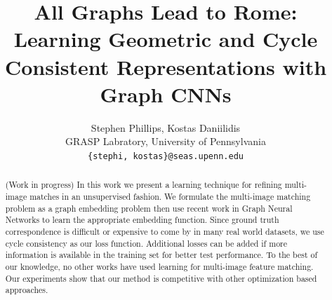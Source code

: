 \documentclass[10pt,twocolumn,letterpaper]{article}
\begin{document}
\title{All Graphs Lead to Rome: Learning Geometric and Cycle Consistent Representations with Graph CNNs}

\author{Stephen Phillips, Kostas Daniilidis \\
GRASP Labratory, University of Pennsylvania\\
{\tt\small \{stephi, kostas\}@seas.upenn.edu}
}



\maketitle


\begin{abstract}
   (Work in progress) In this work we present a learning technique for refining multi-image matches in an unsupervised fashion.
   We formulate the multi-image matching problem as a graph embedding problem then use recent work in Graph Neural Networks to learn the appropriate embedding function.
   Since ground truth correspondence is difficult or expensive to come by in many real world datasets, we use cycle consistency as our loss function.
   Additional losses can be added if more information is available in the training set for better test performance.
   To the best of our knowledge, no other works have used learning for multi-image feature matching.
   Our experiments show that our method is competitive with other optimization based approaches.
\end{abstract}
\end{document}
